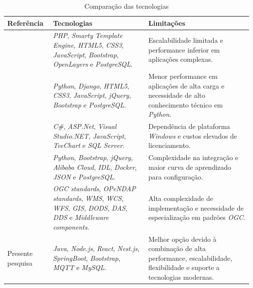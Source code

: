 \begin{table}[!htb]
    \caption{Comparação das tecnologias} \label{tab:comparacao}
    \begin{tabularx}{\textwidth}{|X|X|X|} \hline
        \textbf{Referência} & \textbf{Tecnologias} & \textbf{Limitações} \\ \hline
        \textcite{Taison_webeva2019} & \textit{PHP}, \textit{Smarty Template Engine}, \textit{HTML5}, \textit{CSS3}, \textit{JavaScript}, \textit{Bootstrap}, \textit{OpenLayers} e \textit{PostgreSQL}. & Escalabilidade limitada e performance inferior em aplicações complexas. \\ \hline
        \textcite{Serban_webeva2022} & \textit{Python}, \textit{Django}, \textit{HTML5}, \textit{CSS3}, \textit{JavaScript}, \textit{jQuery}, \textit{Bootstrap} e \textit{PostgreSQL}. & Menor performance em aplicações de alta carga e necessidade de alto conhecimento técnico em \textit{Python}. \\ \hline
        \textcite{Jose_webeva2011} & \textit{C\#}, \textit{ASP.Net}, \textit{Visual Studio.NET}, \textit{JavaScript}, \textit{TeeChart} e \textit{SQL Server}. & Dependência de plataforma \textit{Windows} e custos elevados de licenciamento. \\ \hline
        \textcite{Fangming_webeva2021} & \textit{Python}, \textit{Bootstrap}, \textit{jQuery}, \textit{Alibaba Cloud}, \textit{IDL}, \textit{Docker}, \textit{JSON} e \textit{PostgreSQL}. & Complexidade na integração e maior curva de aprendizado para configuração. \\ \hline
        \textcite{Jianting_webeva2009} & \textit{OGC standards}, \textit{OPeNDAP standards}, \textit{WMS}, \textit{WCS}, \textit{WFS}, \textit{GIS}, \textit{DODS}, \textit{DAS}, \textit{DDS} e \textit{Middleware components}. & Alta complexidade de implementação e necessidade de especialização em padrões \textit{OGC}. \\ \hline
        Presente pesquisa & \textit{Java}, \textit{Node.js}, \textit{React}, \textit{Nest.js}, \textit{SpringBoot}, \textit{Bootstrap}, \textit{MQTT} e \textit{MySQL}. & Melhor opção devido à combinação de alta performance, escalabilidade, flexibilidade e suporte a tecnologias modernas. \\ \hline
    \end{tabularx}
\end{table}

    
    